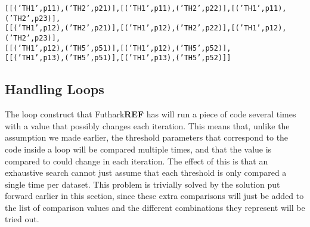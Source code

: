 {\centering
  \texttt{[[('TH1',p11),('TH2',p21)],[('TH1',p11),('TH2',p22)],[('TH1',p11),('TH2',p23)],}\\
  \texttt{[[('TH1',p12),('TH2',p21)],[('TH1',p12),('TH2',p22)],[('TH1',p12),('TH2',p23)],}\\
  \texttt{[[('TH1',p12),('TH5',p51)],[('TH1',p12),('TH5',p52)],}\\
  \texttt{[[('TH1',p13),('TH5',p51)],[('TH1',p13),('TH5',p52)]]}\\
}


\subsection{Handling Loops}
The loop construct that Futhark\textbf{REF} has will run a piece of code several times with
a value that possibly changes each iteration. This means that, unlike the
assumption we made earlier, the threshold
parameters that correspond to the code inside a loop will be compared multiple
times, and that the value is compared to could change in each iteration. The
effect of this is that an exhaustive search cannot just assume that each
threshold is only compared a single time per dataset. This problem is
trivially solved by the solution put forward earlier in this section, since
these extra comparisons will just be added to the list of comparison values and
the different combinations they represent will be tried out.
